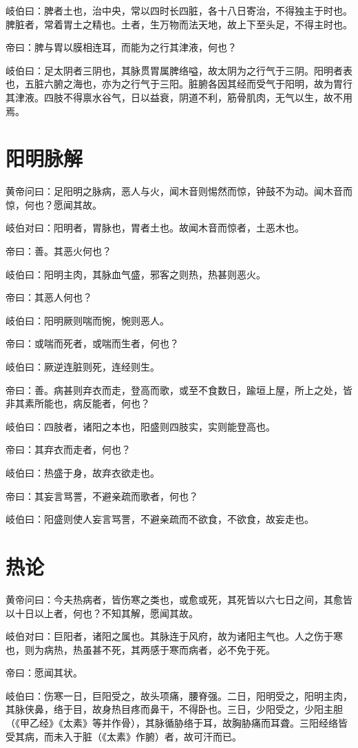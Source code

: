\documentclass{article}%
\begin{document}
岐伯曰：脾者土也，治中央，常以四时长四脏，各十八日寄治，不得独主于时也。脾脏者，常着胃土之精也。土者，生万物而法天地，故上下至头足，不得主时也。

帝曰：脾与胃以膜相连耳，而能为之行其津液，何也？

岐伯曰：足太阴者三阴也，其脉贯胃属脾络嗌，故太阴为之行气于三阴。阳明者表也，五脏六腑之海也，亦为之行气于三阳。脏腑各因其经而受气于阳明，故为胃行其津液。四肢不得禀水谷气，日以益衰，阴道不利，筋骨肌肉，无气以生，故不用焉。
\section{阳明脉解}
黄帝问曰：足阳明之脉病，恶人与火，闻木音则惕然而惊，钟鼓不为动。闻木音而惊，何也？愿闻其故。

岐伯对曰：阳明者，胃脉也，胃者土也。故闻木音而惊者，土恶木也。

帝曰：善。其恶火何也？

岐伯曰：阳明主肉，其脉血气盛，邪客之则热，热甚则恶火。

帝曰：其恶人何也？

岐伯曰：阳明厥则喘而惋，惋则恶人。

帝曰：或喘而死者，或喘而生者，何也？

岐伯曰：厥逆连脏则死，连经则生。

帝曰：善。病甚则弃衣而走，登高而歌，或至不食数日，踰垣上屋，所上之处，皆非其素所能也，病反能者，何也？

岐伯曰：四肢者，诸阳之本也，阳盛则四肢实，实则能登高也。

帝曰：其弃衣而走者，何也？

岐伯曰：热盛于身，故弃衣欲走也。

帝曰：其妄言骂詈，不避亲疏而歌者，何也？

岐伯曰：阳盛则使人妄言骂詈，不避亲疏而不欲食，不欲食，故妄走也。
\section{热论}
黄帝问曰：今夫热病者，皆伤寒之类也，或愈或死，其死皆以六七日之间，其愈皆以十日以上者，何也？不知其解，愿闻其故。

岐伯对曰：巨阳者，诸阳之属也。其脉连于风府，故为诸阳主气也。人之伤于寒也，则为病热，热虽甚不死，其两感于寒而病者，必不免于死。

帝曰：愿闻其状。

岐伯曰：伤寒一日，巨阳受之，故头项痛，腰脊强。二日，阳明受之，阳明主肉，其脉侠鼻，络于目，故身热目疼而鼻干，不得卧也。三日，少阳受之，少阳主胆（《甲乙经》《太素》等并作骨），其脉循胁络于耳，故胸胁痛而耳聋。三阳经络皆受其病，而未入于脏（《太素》作腑）者，故可汗而已。
\end{document}
